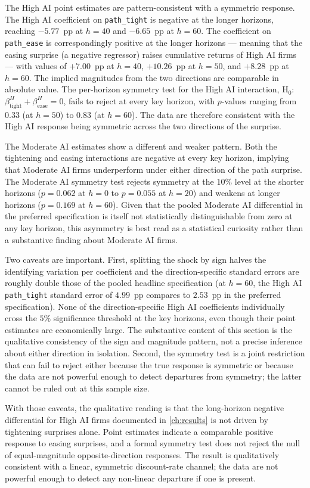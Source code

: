 The High AI point estimates are pattern-consistent with a symmetric
response. The High AI coefficient on \texttt{path\_tight} is
negative at the longer horizons, reaching $-5.77$~pp at $h = 40$
and $-6.65$~pp at $h = 60$. The coefficient on \texttt{path\_ease}
is correspondingly positive at the longer horizons --- meaning
that the easing surprise (a negative regressor) raises cumulative
returns of High AI firms --- with values of $+7.00$~pp at
$h = 40$, $+10.26$~pp at $h = 50$, and $+8.28$~pp at $h = 60$.
The implied magnitudes from the two directions are comparable in
absolute value. The per-horizon symmetry test for the High AI
interaction, H$_0$:
$\beta_{\text{tight}}^{H} + \beta_{\text{ease}}^{H} = 0$, fails to
reject at every key horizon, with $p$-values ranging from $0.33$
(at $h = 50$) to $0.83$ (at $h = 60$). The data are therefore consistent with the High AI response
being symmetric across the two directions of the surprise.

The Moderate AI estimates show a different and weaker pattern. Both
the tightening and easing interactions are negative at every key
horizon, implying that Moderate AI firms underperform under either
direction of the path surprise. The Moderate AI symmetry test
rejects symmetry at the $10\%$ level at the shorter horizons ($p =
0.062$ at $h = 0$ to $p = 0.055$ at $h = 20$) and weakens at longer
horizons ($p = 0.169$ at $h = 60$). Given that the pooled Moderate
AI differential in the preferred specification is itself not
statistically distinguishable from zero at any key horizon, this
asymmetry is best read as a statistical curiosity rather than a
substantive finding about Moderate AI firms.

Two caveats are important. First, splitting the shock by sign halves
the identifying variation per coefficient and the direction-specific
standard errors are roughly double those of the pooled headline
specification (at $h = 60$, the High AI \texttt{path\_tight} standard
error of $4.99$~pp compares to $2.53$~pp in the preferred
specification). None of the direction-specific High AI coefficients
individually cross the $5\%$ significance threshold at the key
horizons, even though their point estimates are economically large.
The substantive content of this section is the qualitative
consistency of the sign and magnitude pattern, not a precise
inference about either direction in isolation. Second, the symmetry
test is a joint restriction that can fail to reject either because
the true response is symmetric or because the data are not powerful
enough to detect departures from symmetry; the latter cannot be
ruled out at this sample size.

With those caveats, the qualitative reading is that the long-horizon
negative differential for High AI firms documented in
\cref{ch:results} is not driven by tightening surprises alone. Point
estimates indicate a comparable positive response to easing
surprises, and a formal symmetry test does not reject the null of
equal-magnitude opposite-direction responses. The result is
qualitatively consistent with a linear, symmetric discount-rate
channel; the data are not powerful enough to detect any non-linear
departure if one is present.